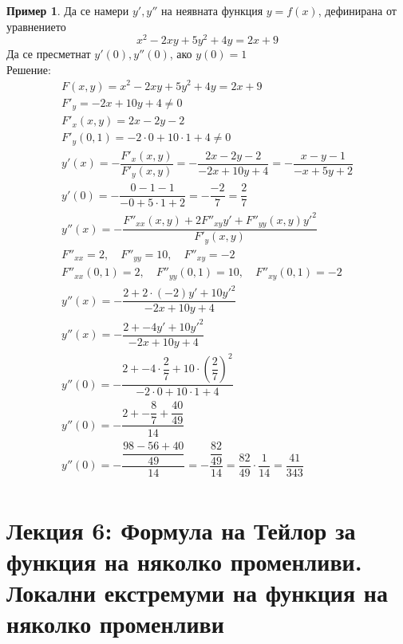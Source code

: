 \documentclass[a4paper,fleqn,12pt]{article}
\theoremstyle{definition}
\newtheorem{example}{Пример}[subsection]
\begin{document}
\begin{example}
Да се намери $y', y''$ на неявната функция $y = f(x)$, дефинирана от уравнението 
$$x^2 - 2xy + 5y^2 + 4y = 2x + 9$$
Да се пресметнат $y'(0), y''(0)$, ако $y(0) = 1$ \\
Решение: 
\begin{gather*}
F(x,y) = x^2 - 2xy + 5y^2 + 4y = 2x + 9\\
F'_y = -2x + 10y + 4 \neq 0\\
F'_x(x,y) = 2x - 2y - 2\\
F'_y(0,1) = -2 \cdot 0 + 10 \cdot 1 + 4 \neq 0\\
y'(x) = - \dfrac{F'_x(x,y)}{F'_y(x,y)} = - \dfrac{2x - 2y - 2}{-2x + 10y + 4} = - \dfrac{x - y - 1}{- x + 5y + 2}\\
y'(0) = - \dfrac{0 - 1 - 1}{- 0 + 5 \cdot 1 + 2} = - \dfrac{-2}{7} = \dfrac{2}{7}\\
y''(x) = - \dfrac{F''_{xx}(x,y) + 2F''_{xy}y' + F''_{yy}(x,y)y'^2}{F'_y(x,y)}\\
F''_{xx} = 2, \quad F''_{yy} = 10, \quad F''_{xy} = -2\\
F''_{xx}(0,1) = 2, \quad F''_{yy}(0,1) = 10, \quad F''_{xy}(0,1) = -2\\
y''(x) = - \dfrac{2 + 2 \cdot (-2)y' + 10y'^2}{-2x + 10y + 4}\\
y''(x) = - \dfrac{2 + - 4y' + 10y'^2}{-2x + 10y + 4}\\
y''(0) = - \dfrac{2 + - 4 \cdot \dfrac{2}{7} + 10 \cdot \left( \dfrac{2}{7} \right) ^2}{-2 \cdot 0 + 10 \cdot 1 + 4}\\
y''(0) = - \dfrac{2 + - \dfrac{8}{7} + \dfrac{40}{49}}{14}\\
y''(0) = - \dfrac{\dfrac{98 - 56 + 40}{49}}{14} = - \dfrac{\dfrac{82}{49}}{14} = \dfrac{82}{49} \cdot \dfrac{1}{14} = \dfrac{41}{343}\\
\end{gather*}
\end{example}

\newpage

\section{Лекция 6: Формула на Тейлор за функция на няколко променливи. Локални екстремуми на функция на няколко променливи}
\end{document}

